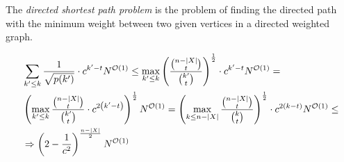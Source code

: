\documentclass[manuscript,screen,review]{acmart}
\begin{document}
\begin{definition}
The \emph{directed shortest path problem} is the problem of finding the directed path with the minimum weight between two given vertices in a directed weighted graph.
\end{definition}


\begin{equation*}
  \begin{split}    
    & \sum_{k' \leq k}   \frac{1}{ \sqrt{ p(k') } } \cdot c^{k'-t} N^{{\mathcal{O}}(1)} \leq  \max_{k' \leq k} \left( \frac{{n - |X| \choose t}}{{k' \choose t}} \right)^{\frac{1}{2}} \cdot c^{k'-t} N^{{\mathcal{O}}(1)} = \\ 
    & \left( \max_{k' \leq k} \frac{{n - |X| \choose t}}{{k' \choose t}}  \cdot c^{2 \left( k'-t \right) } \right)^{\frac{1}{2}} N^{{\mathcal{O}}(1) } =  \left( \max_{k \leq n-|X|} \frac{{n - |X| \choose t}}{{k \choose t}} \right)^{\frac{1}{2}} \cdot c^{ 2 \left(  k-t \right) } N^{{\mathcal{O}}(1)} \le \\ 
    & \Rightarrow  \left(2-\frac{1}{c^{2}}\right)^{ \frac{ n-|X|}{2} }N^{{\mathcal{O}}(1)}
  \end{split}
\end{equation*}


\end{document}
